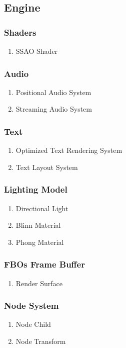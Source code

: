 
\subsection{Engine}
\subsubsection{Shaders}
\begin{enumerate}
\item SSAO Shader
\end{enumerate}
\subsubsection{Audio}
\begin{enumerate}
\item Positional Audio System
\item Streaming Audio System
\end{enumerate}
\subsubsection{Text}
\begin{enumerate}
\item Optimized Text Rendering System
\item Text Layout System
\end{enumerate}
\subsubsection{Lighting Model}
\begin{enumerate}
\item Directional Light
\item Blinn Material
\item Phong Material
\end{enumerate}
\subsubsection{FBOs Frame Buffer}
\begin{enumerate}
\item Render Surface
\end{enumerate}
\subsubsection{Node System}
\begin{enumerate}
\item Node Child
\item Node Transform
\end{enumerate}
